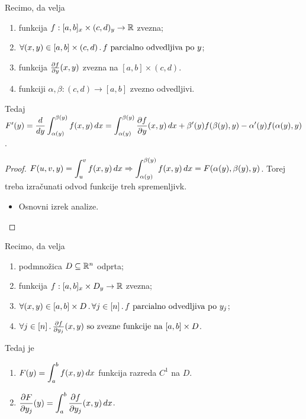 \newpage
\begin{posledica}
    Recimo, da velja
    \begin{enumerate}
        \item funkcija $f:[a,b]_x \times (c,d)_y \to \mathbb{R}$ zvezna;
        \item $\forall (x,y) \in [a,b] \times (c,d) \,.\, f \text{ parcialno odvedljiva po } y$;
        \item funkcija $\frac{\partial f}{\partial y}(x,y)$ zvezna na $[a,b] \times (c,d)$.
        \item funkciji $\alpha, \beta: (c,d) \to [a,b]$ zvezno odvedljivi.
    \end{enumerate}
    Tedaj $F'(y) = \displaystyle \frac{d}{dy} \int_{\alpha(y)}^{\beta(y)}f(x,y) \, dx = \int_{\alpha(y)}^{\beta(y)} \frac{\partial f}{\partial y}(x,y) \, dx + \beta'(y)f(\beta(y), y) - \alpha'(y)f(\alpha(y), y)$.
\end{posledica}

\begin{proof}
    $\displaystyle F(u,v,y) = \int_{u}^{v}f(x,y) \, dx \Rightarrow \int_{\alpha(y)}^{\beta(y)} f(x,y)  \,dx = F(\alpha(y), \beta(y), y)$. Torej treba izračunati odvod funkcije treh spremenljivk. 
    \begin{itemize}
        \item Osnovni izrek analize. \qedhere
    \end{itemize}
\end{proof}

\begin{posledica}
    Recimo, da velja
    \begin{enumerate}
        \item podmnožica $D\subseteq \mathbb{R}^n$ odprta;
        \item funkcija $f: [a,b]_x \times D_y \to \mathbb{R}$ zvezna;
        \item $\forall (x,y) \in [a,b] \times D \,.\, \forall j \in [n] \,.\, f \text{ parcialno odvedljiva po } y_j$;
        \item $\forall j \in [n] \,.\, \frac{\partial f}{\partial y_j}(x,y) \text{ so zvezne funkcije na } [a,b] \times D$.
    \end{enumerate}
    Tedaj je 
    \begin{enumerate}
        \item $\displaystyle F(y) = \int_{a}^{b} f(x,y) \, dx $ funkcija razreda $C^1$ na $D$.
        \item $\displaystyle \frac{\partial F}{\partial y_j}(y) = \int_{a}^{b} \frac{\partial f}{\partial y_j}(x,y) \, dx$.
    \end{enumerate}    
\end{posledica}

